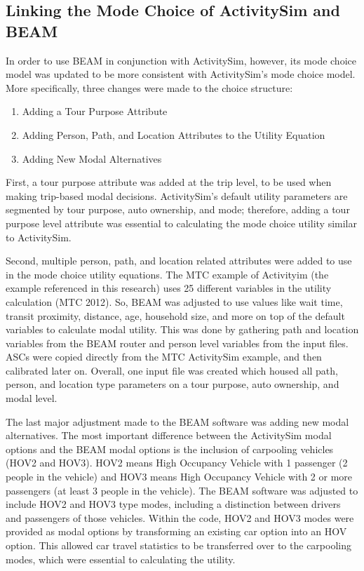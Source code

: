 \documentclass[12pt, oneside, openright]{byuthesis}
\providecommand{\tightlist}{%
  \setlength{\itemsep}{0pt}\setlength{\parskip}{0pt}}
\begin{document}
\hypertarget{meth-beam-link}{%
\subsection{Linking the Mode Choice of ActivitySim and BEAM}\label{meth-beam-link}}

In order to use BEAM in conjunction with ActivitySim, however, its mode choice model was updated to be more consistent with ActivitySim's mode choice model. More specifically, three changes were made to the choice structure:

\begin{enumerate}
\def\labelenumi{\arabic{enumi}.}
\tightlist
\item
  Adding a Tour Purpose Attribute
\item
  Adding Person, Path, and Location Attributes to the Utility Equation
\item
  Adding New Modal Alternatives
\end{enumerate}

First, a tour purpose attribute was added at the trip level, to be used when making trip-based modal decisions. ActivitySim's default utility parameters are segmented by tour purpose, auto ownership, and mode; therefore, adding a tour purpose level attribute was essential to calculating the mode choice utility similar to ActivitySim.

Second, multiple person, path, and location related attributes were added to use in the mode choice utility equations. The MTC example of Activityim (the example referenced in this research) uses 25 different variables in the utility calculation (MTC 2012). So, BEAM was adjusted to use values like wait time, transit proximity, distance, age, household size, and more on top of the default variables to calculate modal utility. This was done by gathering path and location variables from the BEAM router and person level variables from the input files. ASCs were copied directly from the MTC ActivitySim example, and then calibrated later on. Overall, one input file was created which housed all path, person, and location type parameters on a tour purpose, auto ownership, and modal level.

The last major adjustment made to the BEAM software was adding new modal alternatives. The most important difference between the ActivitySim modal options and the BEAM modal options is the inclusion of carpooling vehicles (HOV2 and HOV3). HOV2 means High Occupancy Vehicle with 1 passenger (2 people in the vehicle) and HOV3 means High Occupancy Vehicle with 2 or more passengers (at least 3 people in the vehicle). The BEAM software was adjusted to include HOV2 and HOV3 type modes, including a distinction between drivers and passengers of those vehicles. Within the code, HOV2 and HOV3 modes were provided as modal options by transforming an existing car option into an HOV option. This allowed car travel statistics to be transferred over to the carpooling modes, which were essential to calculating the utility.
\end{document}

